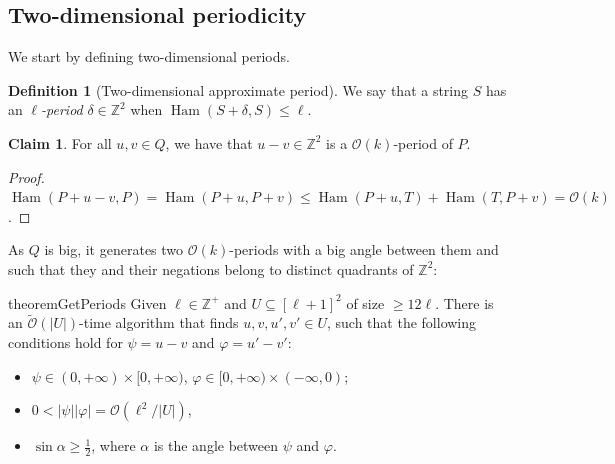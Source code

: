 \documentclass[11pt, letterpaper]{article}
\theoremstyle{plain}
\theoremstyle{definition}
\newtheorem{definition}{Definition}
\newtheorem{claim}{Claim}
\theoremstyle{remark}
\newcommand{\Z}{\mathbb{Z}}
\renewcommand{\O}{\mathcal{O}}
\newcommand{\tO}{\tilde{\mathcal{O}}}
\renewcommand{\phi}{\varphi}
\DeclareMathOperator*{\Ham}{Ham}
\begin{document}
\subsection{Two-dimensional periodicity} \label{periodicity_section}
We start by defining two-dimensional periods.



\begin{definition}[Two-dimensional approximate period]
We say that a string $S$ has an \emph{$\ell$-period} $\delta \in \Z^2$ when $\Ham(S + \delta, S) \le \ell$.
\end{definition}


\begin{claim} \label{periodicity_lemma}
For all $u, v \in Q$, we have that $u - v \in \Z^2$ is a $\O(k)$-period of $P$.
\end{claim}	
\begin{proof}
$\Ham(P + u - v, P) = \Ham(P + u, P + v) \le \Ham(P + u, T) + \Ham(T,P + v) = \O(k)$.
\end{proof}

As $Q$ is big, it generates two $\O(k)$-periods with a big angle between them and such that they and their negations belong to distinct quadrants of $\Z^2$: 

\begin{restatable*}{theorem}{GetPeriods}\label{get_periods}
Given $\ell \in \Z^+$ and $U \subseteq [\ell + 1]^2$ of size $\ge 12\ell$. There is an $\tO(|U|)$-time algorithm that finds $u, v, u', v' \in U$, such that the following conditions hold for $\psi = u - v$ and $\phi = u' - v'$:
	\begin{itemize}
		\item $\psi \in (0, +\infty) \times [0, +\infty)$, $\phi \in [0, +\infty) \times (-\infty, 0)$;
		\item $0 < |\psi||\phi| = \O(\ell^2 / |U|)$,
		\item $\sin \alpha \ge \frac{1}{2}$, where $\alpha$ is the angle between $\psi$ and $\phi$.
	\end{itemize}
\end{restatable*}
\end{document}
